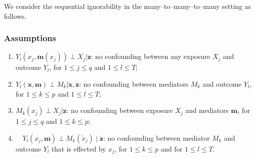 \documentclass[
  12pt]{article}
\def\M{\mathbf{m}}
\def\X{\mathbf{x}}
\def\Y{\mathbf{y}}
\begin{document}
We consider the sequential ignorability \citep{robins1992identifiability, vanderweele2015explanation} in the many--to--many--to--many setting as follows.

\subsubsection*{Assumptions}

\begin{enumerate}
\item[(C1)] $Y_l \left( x_j, \ddot{\mathbf{m}}(x_j) \right )\perp X_j \vert \ddot{\mathbf{z}}$: no confounding between any exposure $X_j$ and outcome $Y_l$, for $ 1 \leq j \leq q$ and $1 \leq l \leq T$;
\item[(C2)] $Y_l(\mathbf{x}, \mathbf{m}) \perp  M_k  \vert  \ddot{\mathbf{x}}, \ddot{\mathbf{z}}$: no confounding between mediators $M_k$ and outcome $Y_l$, for $ 1 \leq k \leq p$ and $ 1 \leq l \leq T$;
\item[(C3)] $M_k (x_j) \perp X_j \vert \ddot{\mathbf{z}}$: no confounding between exposure $X_j$ and mediators $\ddot{\mathbf{m}}$, for $ 1 \leq j \leq q$ and $ 1 \leq k \leq p$;
\item[(C4)] $\quad Y_l(x_j, \mathbf{m}) \perp M_k(\widetilde{x}_j) \mid \ddot{\mathbf{z}}$: no confounding between mediator $M_k$ and outcome $Y_l$ that is effected by $x_j$, for $ 1 \leq k \leq p$ and for $ 1 \leq l \leq T$. 
\end{enumerate}
\end{document}
